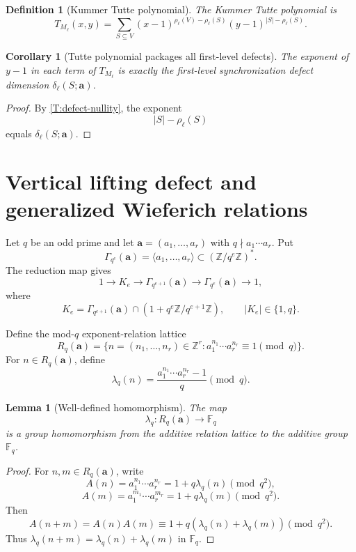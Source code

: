 \documentclass[11pt]{article}
\newtheorem{lemma}{Lemma}
\newtheorem{corollary}{Corollary}
\newtheorem{definition}{Definition}
\newcommand{\Z}{\mathbb Z}
\newcommand{\F}{\mathbb F}
\begin{document}
\begin{definition}[Kummer Tutte polynomial]\label{D:tutte}
The Kummer Tutte polynomial is
\[
T_{M_\ell}(x,y)=
\sum_{S\subseteq V}
(x-1)^{\rho_\ell(V)-\rho_\ell(S)}
(y-1)^{|S|-\rho_\ell(S)}.
\]
\end{definition}

\begin{corollary}[Tutte polynomial packages all first-level defects]\label{C:tutte-packages}
The exponent of \(y-1\) in each term of \(T_{M_\ell}\) is exactly the first-level synchronization defect dimension \(\delta_\ell(S;\mathbf a)\).
\end{corollary}

\begin{proof}
By \cref{T:defect-nullity}, the exponent
\[
|S|-\rho_\ell(S)
\]
equals \(\delta_\ell(S;\mathbf a)\).
\end{proof}

\section{Vertical lifting defect and generalized Wieferich relations}

Let \(q\) be an odd prime and let \(\mathbf a=(a_1,\ldots,a_r)\) with \(q\nmid a_1\cdots a_r\).  Put
\[
\Gamma_{q^e}(\mathbf a)=\langle a_1,\ldots,a_r\rangle\subset(\Z/q^e\Z)^*.
\]
The reduction map gives
\[
1\to K_e\to\Gamma_{q^{e+1}}(\mathbf a)\to\Gamma_{q^e}(\mathbf a)\to1,
\]
where
\[
K_e=\Gamma_{q^{e+1}}(\mathbf a)\cap(1+q^e\Z/q^{e+1}\Z),
\qquad |K_e|\in\{1,q\}.
\]

Define the mod-\(q\) exponent-relation lattice
\[
R_q(\mathbf a)=
\{n=(n_1,\ldots,n_r)\in\Z^r:
a_1^{n_1}\cdots a_r^{n_r}\equiv1\pmod q\}.
\]
For \(n\in R_q(\mathbf a)\), define
\[
\lambda_q(n)
=
\frac{a_1^{n_1}\cdots a_r^{n_r}-1}{q}\pmod q.
\]

\begin{lemma}[Well-defined homomorphism]\label{L:lambda-hom}
The map
\[
\lambda_q:R_q(\mathbf a)\to\F_q
\]
is a group homomorphism from the additive relation lattice to the additive group \(\F_q\).
\end{lemma}

\begin{proof}
For \(n,m\in R_q(\mathbf a)\), write
\[
A(n)=a_1^{n_1}\cdots a_r^{n_r}=1+q\lambda_q(n)\pmod{q^2},
\]
\[
A(m)=a_1^{m_1}\cdots a_r^{m_r}=1+q\lambda_q(m)\pmod{q^2}.
\]
Then
\[
A(n+m)=A(n)A(m)
\equiv
1+q(\lambda_q(n)+\lambda_q(m))
\pmod{q^2}.
\]
Thus \(\lambda_q(n+m)=\lambda_q(n)+\lambda_q(m)\) in \(\F_q\).
\end{proof}
\end{document}
